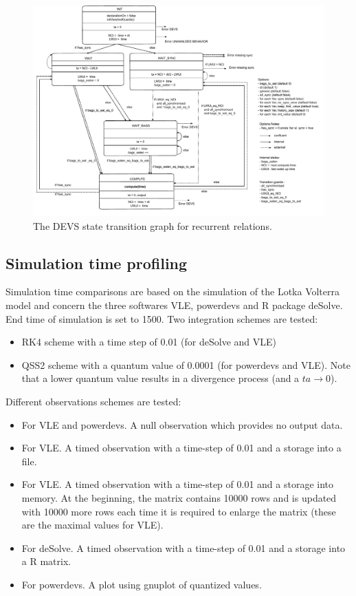 \documentclass{article}
\theoremstyle{remark}
\begin{document}
\begin{landscape}
\vspace{-10cm}
\begin{figure}[!h]
\begin{center} 
\includegraphics[scale=0.50]{figures/DEVS_states.pdf}
\caption{\label{fig:DEVSgraph} The DEVS state transition graph 
for recurrent relations.}
\end{center}
\end{figure}
\end{landscape}

\subsection{Simulation time profiling}

Simulation time comparisons are based on the simulation of the Lotka Volterra
model and concern the three softwares VLE, powerdevs and R package deSolve. 
End time of simulation is set to 1500.
Two integration schemes are tested:
\begin{itemize}
  \item RK4 scheme with a time step of 0.01 (for deSolve and VLE)
  \item QSS2 scheme with a quantum value of 0.0001 (for powerdevs and VLE). Note
  that a lower quantum value results in a divergence process (and a $ta \to
  0$).
\end{itemize}
Different observations schemes are tested:
\begin{itemize}
  \item For VLE and powerdevs. A null observation which provides no output
  data.
  \item For VLE. A timed observation with a time-step of 0.01 and a 
  storage into a file.
  \item For VLE. A timed observation with a time-step of 0.01 and a 
  storage into memory. At the beginning, the matrix contains 
  10000 rows and is updated with 10000 more rows each time it is required to
  enlarge the matrix (these are the maximal values for VLE).
  \item For deSolve. A timed observation with a time-step of 0.01 and a 
  storage into a R matrix.
  \item For powerdevs. A plot using gnuplot of quantized values.
\end{itemize}
\end{document}
